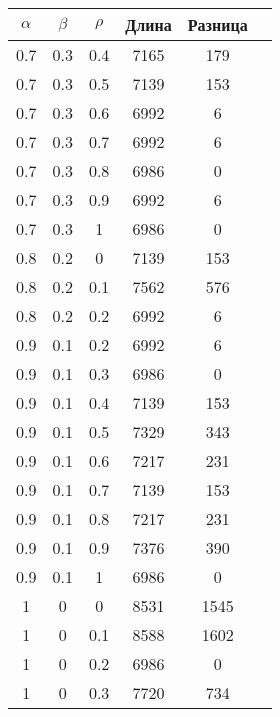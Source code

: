\begin{table}[!h]
    \begin{center}
        \begin{tabular}{|c@{\hspace{7mm}}|c@{\hspace{7mm}}|c@{\hspace{7mm}}|c@{\hspace{7mm}}|c@{\hspace{7mm}}|c|}
            \hline
            $\alpha$ & $\beta$ & $\rho$ & Длина & Разница \\
            \hline
            0.7  & 0.3  & 0.4  & 7165  & 179   \\
            0.7  & 0.3  & 0.5  & 7139  & 153   \\
            0.7  & 0.3  & 0.6  & 6992  & 6     \\
            0.7  & 0.3  & 0.7  & 6992  & 6     \\
            0.7  & 0.3  & 0.8  & 6986  & 0     \\
            0.7  & 0.3  & 0.9  & 6992  & 6     \\
            0.7  & 0.3  & 1    & 6986  & 0     \\
            0.8  & 0.2  & 0    & 7139  & 153   \\
            0.8  & 0.2  & 0.1  & 7562  & 576   \\
            0.8  & 0.2  & 0.2  & 6992  & 6     \\
            0.9  & 0.1  & 0.2  & 6992  & 6     \\
            0.9  & 0.1  & 0.3  & 6986  & 0     \\
            0.9  & 0.1  & 0.4  & 7139  & 153   \\
            0.9  & 0.1  & 0.5  & 7329  & 343   \\
            0.9  & 0.1  & 0.6  & 7217  & 231   \\
            0.9  & 0.1  & 0.7  & 7139  & 153   \\
            0.9  & 0.1  & 0.8  & 7217  & 231   \\
            0.9  & 0.1  & 0.9  & 7376  & 390   \\
            0.9  & 0.1  & 1    & 6986  & 0     \\
            1    & 0    & 0    & 8531  & 1545  \\
            1    & 0    & 0.1  & 8588  & 1602  \\
            1    & 0    & 0.2  & 6986  & 0     \\
            1    & 0    & 0.3  & 7720  & 734   \\

\end{tabular}
\end{center}
\end{table}
